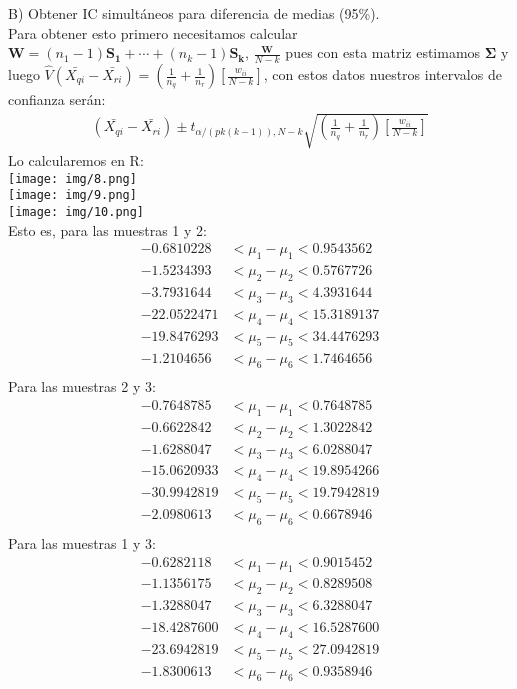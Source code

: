 \begin{sol}
B) Obtener IC simultáneos para diferencia de medias (95\%).\\
Para obtener esto primero necesitamos calcular $\bm{W}=(n_1-1)\bm{S_1}+\cdots+(n_k-1)\bm{S_k}$, $\frac{\bm{W}}{N-k}$ pues con esta matriz estimamos $\bm{\Sigma}$ y luego $\hat{V}(\bar{X_{qi}}-\bar{X_{ri}})=(\frac{1}{n_q}+\frac{1}{n_r})[\frac{w_{ii}}{N-k}]$, con estos datos nuestros intervalos de confianza serán:
\begin{align*}
(\bar{X_{qi}}-\bar{X_{ri}}) \pm t_{\alpha/(pk(k-1)),N-k}\sqrt{(\frac{1}{n_q}+\frac{1}{n_r})[\frac{w_{ii}}{N-k}]}
\end{align*}
Lo calcularemos en R:\\
\texttt{[image: img/8.png]}\\
\texttt{[image: img/9.png]}\\
\texttt{[image: img/10.png]}\\
Esto es, para las muestras 1 y 2:
\begin{align*}
-0.6810228 &< \mu_{1} - \mu_{1} < 0.9543562 \\
-1.5234393 &< \mu_{2} - \mu_{2} < 0.5767726 \\
-3.7931644 &< \mu_{3} - \mu_{3} < 4.3931644 \\
-22.0522471 &< \mu_{4} - \mu_{4} < 15.3189137 \\
-19.8476293 &< \mu_{5} - \mu_{5} < 34.4476293 \\
-1.2104656 &< \mu_{6} - \mu_{6} < 1.7464656 \\
\end{align*}
Para las muestras 2 y 3:
\begin{align*}
-0.7648785 &< \mu_{1} - \mu_{1} < 0.7648785 \\
-0.6622842 &< \mu_{2} - \mu_{2} < 1.3022842 \\
-1.6288047 &< \mu_{3} - \mu_{3} < 6.0288047 \\
-15.0620933 &< \mu_{4} - \mu_{4} < 19.8954266 \\
-30.9942819 &< \mu_{5} - \mu_{5} < 19.7942819 \\
-2.0980613 &< \mu_{6} - \mu_{6} < 0.6678946 \\
\end{align*}
Para las muestras 1 y 3:
\begin{align*}
-0.6282118 &< \mu_{1} - \mu_{1} < 0.9015452 \\
-1.1356175 &< \mu_{2} - \mu_{2} < 0.8289508 \\
-1.3288047 &< \mu_{3} - \mu_{3} < 6.3288047 \\
-18.4287600 &< \mu_{4} - \mu_{4} < 16.5287600 \\
-23.6942819 &< \mu_{5} - \mu_{5} < 27.0942819 \\
-1.8300613 &< \mu_{6} - \mu_{6} < 0.9358946 \\
\end{align*}


\end{sol}
